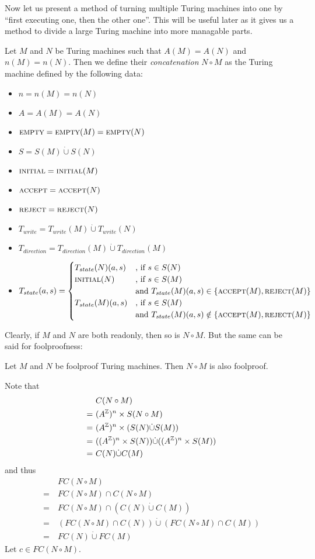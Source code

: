 Now let us present a method of turning multiple Turing machines into one by ``first executing one, then the other one''. This will be useful later as it gives us a method to divide a large Turing machine into more managable parts.

\begin{Definition}
	Let $M$ and $N$ be Turing machines such that $A(M) = A(N)$ and $n(M) = n(N)$. Then we define their \emph{concatenation} $N \circ M$ as the Turing machine defined by the following data:
	\begin{itemize}
		\item{$n = n(M) = n(N)$}
		\item{$A = A(M) = A(N)$}
		\item{$\text{\scshape{empty}} = \text{\scshape{empty}}(M) = \text{\scshape{empty}}(N)$}
		\item{$S = S(M) \dot\cup S(N)$}
		\item{$\text{\scshape{initial}} = \text{\scshape{initial}}(M)$}
		\item{$\text{\scshape{accept}} = \text{\scshape{accept}}(N)$}
		\item{$\text{\scshape{reject}} = \text{\scshape{reject}}(N)$}
		\item{$T_{write} = T_{write}(M) \dot\cup T_{write}(N)$}
		\item{$T_{direction} = T_{direction}(M) \dot\cup T_{direction}(M)$}
		\item{$T_{state} (a,s) =
			\begin{cases}
				T_{state}(N) (a,s) &\text{, if}~s \in S(N) \\
				\text{\scshape{initial}}(N) &\text{, if}~s \in S(M) \\&\text{and}~T_{state}(M)(a,s) \in \{\text{\scshape{accept}}(M),\text{\scshape{reject}}(M)\} \\
				T_{state}(M) (a,s) &\text{, if}~s \in S(M) \\&\text{and}~T_{state}(M)(a,s) \notin \{\text{\scshape{accept}}(M),\text{\scshape{reject}}(M)\}
			\end{cases}
		$}
	\end{itemize}
\end{Definition}
Clearly, if $M$ and $N$ are both readonly, then so is $N \circ M$. But the same can be said for foolproofness:

\begin{Lemma}
	Let $M$ and $N$ be foolproof Turing machines. Then $N \circ M$ is also foolproof.
\end{Lemma}
\proof
Note that
\begin{align*}
	&C(N \circ M) \\
	=~&(A^{\mathbb{Z}})^n \times S(N \circ M) \\
	=~&(A^{\mathbb{Z}})^n \times (S(N) \dot\cup S(M)) \\
	=~&((A^{\mathbb{Z}})^n \times S(N)) \dot\cup ((A^{\mathbb{Z}})^n \times S(M)) \\
	=~&C(N) \dot\cup C(M)
\end{align*}
and thus
\begin{align*}
	&FC(N \circ M) \\
	=~&FC(N \circ M) \cap C(N \circ M) \\
	=~&FC(N \circ M) \cap (C(N) \dot\cup C(M)) \\
	=~&(FC(N \circ M) \cap C(N)) \dot\cup (FC(N \circ M) \cap C(M)) \\
	=~&FC(N) \dot\cup FC(M)
\end{align*}
Let $c \in FC(N \circ M)$.
